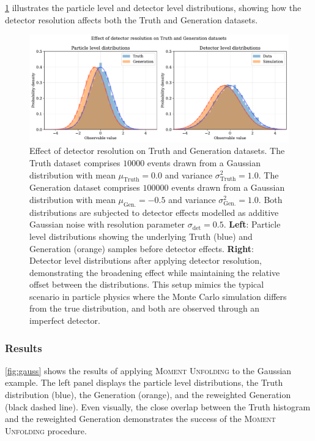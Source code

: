             \cref{fig:gaussian-setup} illustrates the particle level and detector level distributions, showing how the detector resolution affects both the Truth and Generation datasets.
\begin{figure}
    \centering
    \includegraphics[width=\textwidth]{figures/chapter-05/gaussian-setup.pdf}
    \caption[Effect of detector resolution on Truth and Generation datasets]{%
        Effect of detector resolution on Truth and Generation datasets. 
        The Truth dataset comprises $\num{10000}$ events drawn from a Gaussian distribution 
        with mean $\mu_{\textrm{Truth}} = 0.0$ and variance $\sigma^2_{\textrm{Truth}} = 1.0$. 
        The Generation dataset comprises $\num{100000}$ events drawn from a Gaussian distribution 
        with mean $\mu_{\textrm{Gen.}} = -0.5$ and variance $\sigma^2_{\textrm{Gen.}} = 1.0$. 
        Both distributions are subjected to detector effects modelled as additive Gaussian noise 
        with resolution parameter $\sigma_{\textrm{det}} = 0.5$. 
        \textbf{Left}: Particle level distributions showing the underlying Truth (blue) and 
        Generation (orange) samples before detector effects. 
        \textbf{Right}: Detector level distributions after applying detector resolution, 
        demonstrating the broadening effect while maintaining the relative offset between 
        the distributions. This setup mimics the typical scenario in particle physics where 
        the Monte Carlo simulation differs from the true distribution, and both are observed 
        through an imperfect detector.%
    }
    \label{fig:gaussian-setup}
\end{figure}
        \subsubsection{Results}
            \cref{fig:gauss} shows the results of applying \textsc{Moment Unfolding} to the Gaussian example.
            The left panel displays the particle level distributions, the Truth distribution (blue), the Generation (orange), and the reweighted Generation (black dashed line). 
            Even visually, the close overlap between the Truth histogram and the reweighted Generation demonstrates the success of the \textsc{Moment Unfolding} procedure.


